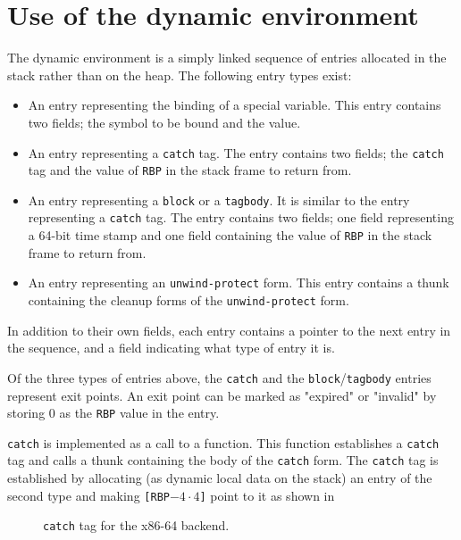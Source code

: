 \section{Use of the dynamic environment}

The dynamic environment is a simply linked sequence of entries
allocated in the stack rather than on the heap.  The following entry
types exist:

\begin{itemize}
  \item An entry representing the binding of a special variable.  This
    entry contains two fields; the symbol to be bound and the value.

  \item An entry representing a \texttt{catch} tag.  The entry
    contains two fields; the \texttt{catch} tag and the value of
    \texttt{RBP} in the stack frame to return from.

  \item An entry representing a \texttt{block} or a \texttt{tagbody}.
    It is similar to the entry representing a \texttt{catch} tag.  The
    entry contains two fields; one field representing a 64-bit time
    stamp and one field containing the value of \texttt{RBP} in the
    stack frame to return from.

  \item An entry representing an \texttt{unwind-protect} form.  This
    entry contains a thunk containing the cleanup forms of the
    \texttt{unwind-protect} form.
\end{itemize}

In addition to their own fields, each entry contains a pointer to the
next entry in the sequence, and a field indicating what type of entry
it is.

Of the three types of entries above, the \texttt{catch} and the
\texttt{block}/\texttt{tagbody} entries represent exit points.  An
exit point can be marked as "expired" or "invalid" by storing 0 as the
\texttt{RBP} value in the entry.

\texttt{catch} is implemented as a call to a function.  This function
establishes a \texttt{catch} tag and calls a thunk containing the body
of the \texttt{catch} form.  The \texttt{catch} tag is established by
allocating (as dynamic local data on the stack) an entry of the second
type and making \texttt{[RBP$-4 \cdot 4$]} point to it as shown in

\begin{figure}
\begin{center}
\end{center}
\caption{\label{fig-x86-64-catch}
\texttt{catch} tag for the x86-64 backend.}
\end{figure}

